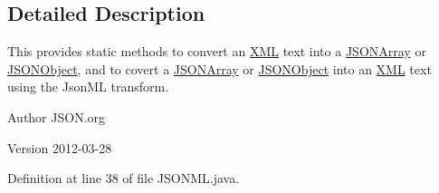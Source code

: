 \subsection{Detailed Description}
This provides static methods to convert an \hyperlink{classorg_1_1json_1_1_x_m_l}{X\-M\-L} text into a \hyperlink{classorg_1_1json_1_1_j_s_o_n_array}{J\-S\-O\-N\-Array} or \hyperlink{classorg_1_1json_1_1_j_s_o_n_object}{J\-S\-O\-N\-Object}, and to covert a \hyperlink{classorg_1_1json_1_1_j_s_o_n_array}{J\-S\-O\-N\-Array} or \hyperlink{classorg_1_1json_1_1_j_s_o_n_object}{J\-S\-O\-N\-Object} into an \hyperlink{classorg_1_1json_1_1_x_m_l}{X\-M\-L} text using the Json\-M\-L transform.

\begin{DoxyAuthor}{Author}
J\-S\-O\-N.\-org 
\end{DoxyAuthor}
\begin{DoxyVersion}{Version}
2012-\/03-\/28 
\end{DoxyVersion}


Definition at line 38 of file J\-S\-O\-N\-M\-L.\-java.



